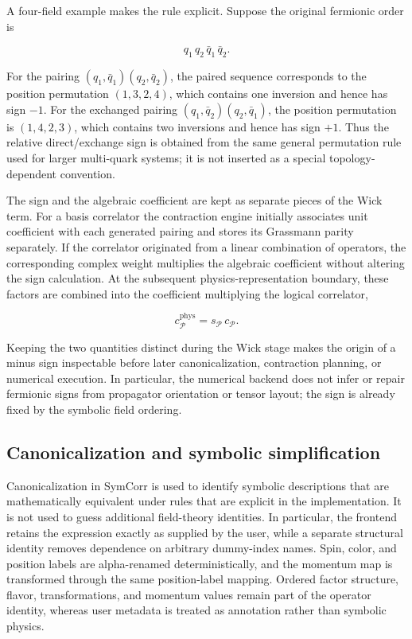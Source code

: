 \documentclass[11pt]{article}
\begin{document}
A four-field example makes the rule explicit. Suppose the original fermionic
order is

\begin{equation}
q_1\,q_2\,\bar q_1\,\bar q_2 .
\end{equation}

For the pairing
\((q_1,\bar q_1)(q_2,\bar q_2)\), the paired sequence corresponds to the
position permutation \((1,3,2,4)\), which contains one inversion and hence has
sign \(-1\). For the exchanged pairing
\((q_1,\bar q_2)(q_2,\bar q_1)\), the position permutation is
\((1,4,2,3)\), which contains two inversions and hence has sign \(+1\).
Thus the relative direct/exchange sign is obtained from the same general
permutation rule used for larger multi-quark systems; it is not inserted as a
special topology-dependent convention.

The sign and the algebraic coefficient are kept as separate pieces of the Wick
term. For a basis correlator the contraction engine initially associates unit
coefficient with each generated pairing and stores its Grassmann parity
separately. If the correlator originated from a linear combination of
operators, the corresponding complex weight multiplies the algebraic
coefficient without altering the sign calculation. At the subsequent
physics-representation boundary, these factors are combined into the
coefficient multiplying the logical correlator,

\begin{equation}
c_{\mathcal P}^{\mathrm{phys}}
=
s_{\mathcal P}\,c_{\mathcal P}.
\label{eq:wick_sign_coefficient}
\end{equation}

Keeping the two quantities distinct during the Wick stage makes the origin of a
minus sign inspectable before later canonicalization, contraction planning, or
numerical execution. In particular, the numerical backend does not infer or
repair fermionic signs from propagator orientation or tensor layout; the sign
is already fixed by the symbolic field ordering.

\subsection{Canonicalization and symbolic simplification}

Canonicalization in SymCorr is used to identify symbolic descriptions that are
mathematically equivalent under rules that are explicit in the implementation.
It is not used to guess additional field-theory identities. In particular, the
frontend retains the expression exactly as supplied by the user, while a
separate structural identity removes dependence on arbitrary dummy-index names.
Spin, color, and position labels are alpha-renamed deterministically, and the
momentum map is transformed through the same position-label mapping. Ordered
factor structure, flavor, transformations, and momentum values remain part of
the operator identity, whereas user metadata is treated as annotation rather
than symbolic physics.
\end{document}
